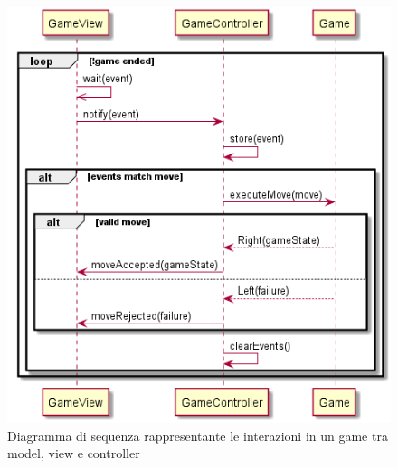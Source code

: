 \begin{figure}
  \centering
  \includegraphics[width=\linewidth]{images/uml/gui_sequence.png}
  \caption{Diagramma di sequenza rappresentante le interazioni in un game tra model, view e controller}
  \label{fig:gui_sequence}
\end{figure}


